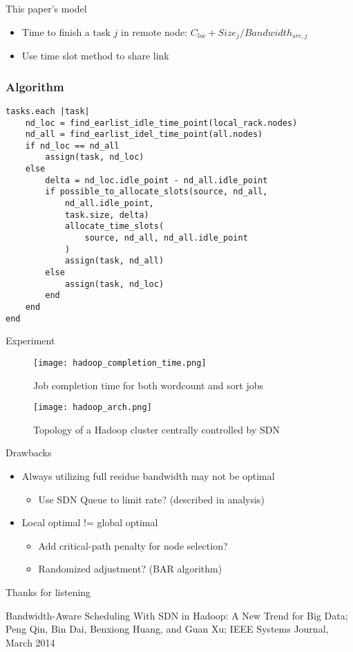 \documentclass{beamer}
\begin{document}
\begin{frame}{This paper's model}
\begin{itemize}
    \item Time to finish a task $j$ in remote node: $C_{loc} + Size_j / Bandwidth_{src, j}$
    \item Use time slot method to share link
\end{itemize}
\end{frame}

\begin{frame}[fragile]
\frametitle{Algorithm}
\footnotesize
\begin{verbatim}
tasks.each |task|
    nd_loc = find_earlist_idle_time_point(local_rack.nodes)
    nd_all = find_earlist_idel_time_point(all.nodes)
    if nd_loc == nd_all
        assign(task, nd_loc)
    else
        delta = nd_loc.idle_point - nd_all.idle_point
        if possible_to_allocate_slots(source, nd_all,
            nd_all.idle_point,
            task.size, delta)
            allocate_time_slots(
                source, nd_all, nd_all.idle_point
            )
            assign(task, nd_all)
        else
            assign(task, nd_loc)
        end
    end
end
\end{verbatim}
\end{frame}

\begin{frame}{Experiment}
\begin{figure}
\centering
\begin{minipage}{.5\textwidth}
  \centering
    \texttt{[image: hadoop\_completion\_time.png]}
    \caption{Job completion time for both wordcount and sort jobs}
\end{minipage}%
\begin{minipage}{.5\textwidth}
  \centering
 \texttt{[image: hadoop\_arch.png]}
 \caption{Topology of a Hadoop cluster centrally controlled by SDN}
\end{minipage}
\end{figure}
\end{frame}

\begin{frame}{Drawbacks}
    \begin{itemize}
        \item Always utilizing full residue bandwidth may not be optimal
            \begin{itemize}
                \item Use SDN Queue to limit rate? (described in analysis)
            \end{itemize}
        \item Local optimal != global optimal
            \begin{itemize}
                \item Add critical-path penalty for node selection?
                \item Randomized adjustment? (BAR algorithm)
            \end{itemize}
    \end{itemize}
\end{frame}

\begin{frame}[standout]
    Thanks for listening
    
    \scriptsize
    Bandwidth-Aware Scheduling With SDN in Hadoop: A New Trend for Big Data;
    Peng Qin, Bin Dai, Benxiong Huang, and Guan Xu;
    IEEE Systems Journal, March 2014
\end{frame}
\end{document}
